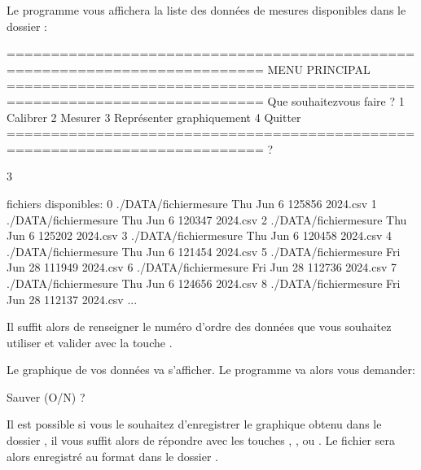 \documentclass[letterpaper,10pt,french]{sphinxmanual}
\begin{document}
\sphinxAtStartPar
Le programme vous affichera la liste des données de mesures disponibles dans le dossier :

\begin{sphinxVerbatim}[commandchars=\\\{\}]
===========================================================================
MENU PRINCIPAL
===========================================================================
Que souhaitez\PYGZhy{}vous faire ?
1 \PYGZhy{} Calibrer
2 \PYGZhy{} Mesurer
3 \PYGZhy{} Représenter graphiquement
4 \PYGZhy{} Quitter
===========================================================================
?

\PYGZhy{}\PYGZgt{} 3

    fichiers disponibles:
    0 \PYGZhy{} ./DATA/fichier\PYGZus{}mesure Thu Jun  6 12\PYGZus{}58\PYGZus{}56 2024.csv
    1 \PYGZhy{} ./DATA/fichier\PYGZus{}mesure Thu Jun  6 12\PYGZus{}03\PYGZus{}47 2024.csv
    2 \PYGZhy{} ./DATA/fichier\PYGZus{}mesure Thu Jun  6 12\PYGZus{}52\PYGZus{}02 2024.csv
    3 \PYGZhy{} ./DATA/fichier\PYGZus{}mesure Thu Jun  6 12\PYGZus{}04\PYGZus{}58 2024.csv
    4 \PYGZhy{} ./DATA/fichier\PYGZus{}mesure Thu Jun  6 12\PYGZus{}14\PYGZus{}54 2024.csv
    5 \PYGZhy{} ./DATA/fichier\PYGZus{}mesure Fri Jun 28 11\PYGZus{}19\PYGZus{}49 2024.csv
    6 \PYGZhy{} ./DATA/fichier\PYGZus{}mesure Fri Jun 28 11\PYGZus{}27\PYGZus{}36 2024.csv
    7 \PYGZhy{} ./DATA/fichier\PYGZus{}mesure Thu Jun  6 12\PYGZus{}46\PYGZus{}56 2024.csv
    8 \PYGZhy{} ./DATA/fichier\PYGZus{}mesure Fri Jun 28 11\PYGZus{}21\PYGZus{}37 2024.csv
    ...
\end{sphinxVerbatim}

\sphinxAtStartPar
Il suffit alors de renseigner le numéro d’ordre des données que vous souhaitez utiliser et valider avec la touche .

\noindent{}

\sphinxAtStartPar
Le graphique de vos données va s’afficher. Le programme va alors vous demander:

\begin{sphinxVerbatim}[commandchars=\\\{\}]
Sauver (O/N) ?
\end{sphinxVerbatim}

\sphinxAtStartPar
Il est possible si vous le souhaitez d’enregistrer le graphique obtenu dans le dossier , il vous suffit alors de répondre avec les touches
, ,  ou .
Le fichier sera alors enregistré au format  dans le dossier .
\end{document}
